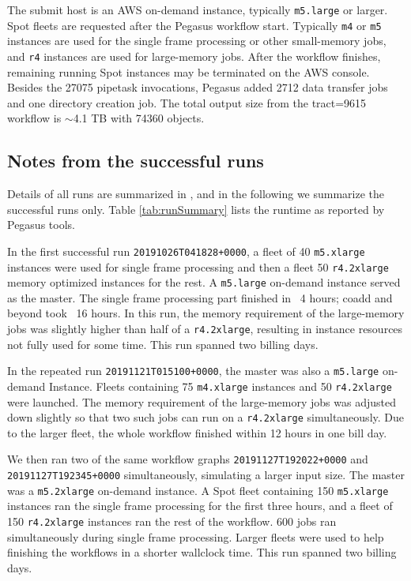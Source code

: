 The submit host is an AWS on-demand instance, typically \texttt{m5.large} or larger.
Spot fleets are requested after the Pegasus workflow start.
Typically \texttt{m4} or \texttt{m5} instances are used for the single frame processing or other small-memory jobs, and \texttt{r4} instances are used for large-memory jobs.
After the workflow finishes, remaining running Spot instances may be terminated on the AWS console.
Besides the 27075 pipetask invocations, Pegasus added 2712 data transfer jobs and one directory creation job.
The total output size from the tract=9615 workflow is $\sim$4.1 TB with 74360 objects.

\subsection{Notes from the successful runs}

Details of all runs are summarized in , and in the following we summarize the successful runs only.
Table \ref{tab:runSummary} lists the runtime as reported by Pegasus tools.



In the first successful run \texttt{20191026T041828+0000}, a fleet of 40 \texttt{m5.xlarge} instances were used for single frame processing and then a fleet 50 \texttt{r4.2xlarge} memory optimized instances for the rest.
A \texttt{m5.large} on-demand instance served as the master.
The single frame processing part finished in ~4 hours; coadd and beyond took ~16 hours.
In this run, the memory requirement of the large-memory jobs was slightly higher than half of a \texttt{r4.2xlarge}, resulting in instance resources not fully used for some time.
This run spanned two billing days.

In the repeated run \texttt{20191121T015100+0000}, the master was also a \texttt{m5.large} on-demand Instance.
Fleets containing 75 \texttt{m4.xlarge} instances and 50 \texttt{r4.2xlarge} were launched.
The memory requirement of the large-memory jobs was adjusted down slightly so that two such jobs can run on a \texttt{r4.2xlarge} simultaneously.
Due to the larger fleet, the whole workflow finished within 12 hours in one bill day.

We then ran two of the same workflow graphs \texttt{20191127T192022+0000} and \texttt{20191127T192345+0000} simultaneously, simulating a larger input size.
The master was a \texttt{m5.2xlarge} on-demand instance.
A Spot fleet containing 150 \texttt{m5.xlarge} instances ran the single frame processing for the first three hours, and a fleet of 150 \texttt{r4.2xlarge} instances ran the rest of the workflow.
600 jobs ran simultaneously during single frame processing.
Larger fleets were used to help finishing the workflows in a shorter wallclock time.
This run spanned two billing days.

